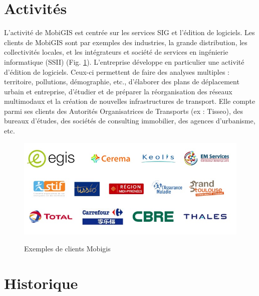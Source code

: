 \pagebreak

\section{Activités}

L'activité de MobiGIS est centrée sur les services SIG et l'édition de logiciels. Les clients de MobiGIS sont par exemples des industries, la grande distribution, les collectivités locales, et les intégrateurs et société de services en ingénierie informatique (SSII) (Fig. \ref{ClientsMobigis}). L'entreprise développe en particulier une activité d'édition de logiciels. Ceux-ci permettent de faire des analyses multiples : territoire, pollutions, démographie, etc., d'élaborer des plans de déplacement urbain et entreprise, d'étudier et de préparer la réorganisation des réseaux multimodaux et la création de nouvelles infrastructures de transport. Elle compte parmi ses clients des Autorités Organisatrices de Transports (ex : Tisseo), des bureaux d'études, des sociétés de consulting immobilier, des agences d'urbanisme, etc.\\

\begin{center}
\begin{figure}[h] \centering
\includegraphics[width=16cm]{images/fig2_referencesMobigis.JPG}\\
\caption{\label{ClientsMobigis} Exemples de clients Mobigis}
\end{figure}
\end{center}

\section{Historique}

